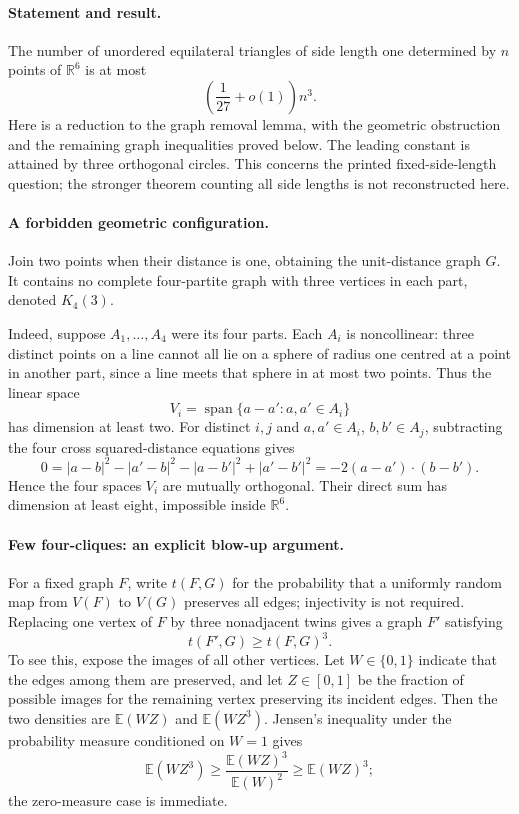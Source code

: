 \paragraph{Statement and result.}
The number of unordered equilateral triangles of side length one determined by \(n\) points of \(\mathbb R^6\) is at most
\[
 \left(\frac1{27}+o(1)\right)n^3.
\]
Here is a reduction to the graph removal lemma, with the geometric obstruction and the remaining graph inequalities proved below. The leading constant is attained by three orthogonal circles. This concerns the printed fixed-side-length question; the stronger theorem counting all side lengths is not reconstructed here.

\paragraph{A forbidden geometric configuration.}
Join two points when their distance is one, obtaining the unit-distance graph \(G\). It contains no complete four-partite graph with three vertices in each part, denoted \(K_4(3)\).

Indeed, suppose \(A_1,\ldots,A_4\) were its four parts. Each \(A_i\) is noncollinear: three distinct points on a line cannot all lie on a sphere of radius one centred at a point in another part, since a line meets that sphere in at most two points. Thus the linear space
\[
 V_i=\operatorname{span}\{a-a':a,a'\in A_i\}
\]
has dimension at least two. For distinct \(i,j\) and \(a,a'\in A_i\), \(b,b'\in A_j\), subtracting the four cross squared-distance equations gives
\[
 0=|a-b|^2-|a'-b|^2-|a-b'|^2+|a'-b'|^2
   =-2(a-a')\cdot(b-b').
\]
Hence the four spaces \(V_i\) are mutually orthogonal. Their direct sum has dimension at least eight, impossible inside \(\mathbb R^6\).

\paragraph{Few four-cliques: an explicit blow-up argument.}
For a fixed graph \(F\), write \(t(F,G)\) for the probability that a uniformly random map from \(V(F)\) to \(V(G)\) preserves all edges; injectivity is not required. Replacing one vertex of \(F\) by three nonadjacent twins gives a graph \(F'\) satisfying
\[
 t(F',G)\geq t(F,G)^3. \tag{1}
\]
To see this, expose the images of all other vertices. Let \(W\in\{0,1\}\) indicate that the edges among them are preserved, and let \(Z\in[0,1]\) be the fraction of possible images for the remaining vertex preserving its incident edges. Then the two densities are \(\mathbb E(WZ)\) and \(\mathbb E(WZ^3)\). Jensen's inequality under the probability measure conditioned on \(W=1\) gives
\[
 \mathbb E(WZ^3)\geq\frac{\mathbb E(WZ)^3}{\mathbb E(W)^2}
 \geq\mathbb E(WZ)^3;
\]
the zero-measure case is immediate.

